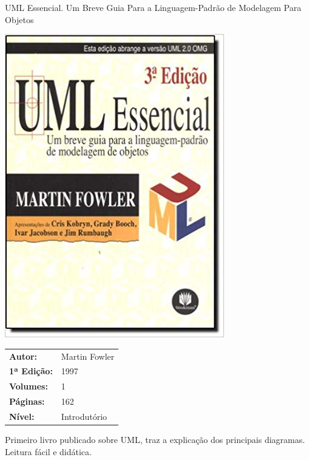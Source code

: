 \begin{frame}[fragile]{UML Essencial. Um Breve Guia Para a Linguagem-Padrão de Modelagem Para Objetos}

    \begin{minipage}{0.4\textwidth}
        \includegraphics[scale=0.25]{uml.jpg}
    \end{minipage}
    \begin{minipage}{0.5\textwidth}
        \begin{small}
            \begin{tabularx}{0.95\textwidth}{lX}
                \textbf{Autor:} & Martin Fowler \\
                \textbf{1ª Edição:} & 1997 \\
                \textbf{Volumes:} & 1 \\
                \textbf{Páginas:} & 162 \\
                \textbf{Nível:} & Introdutório \\
            \end{tabularx}
        \end{small}
    \end{minipage}

    \vspace{0.2in} 

    Primeiro livro publicado sobre UML, traz a explicação dos principais diagramas. Leitura
    fácil e didática.

\end{frame}

